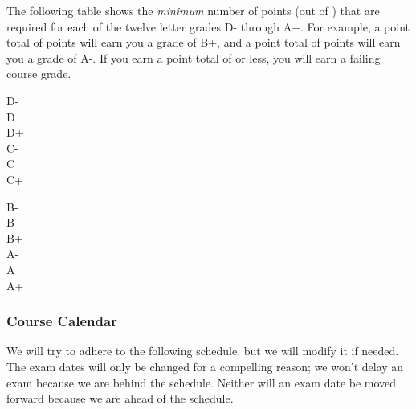 \documentclass[12pt,fullpage]{article}
\newcounter{ex}\setcounter{ex}{0}
\newenvironment{mypar}[2]
  {\begin{list}{}%
    {\setlength\leftmargin{#1}
    \setlength\rightmargin{#2}}
    \item[]}
  {\end{list}}
\begin{document}
 
\noindent The following table shows the \emph{minimum} number of points (out of \points) that
 are required for each of the twelve letter grades D- through A+. For
 example, a point total of \Bp\/  points will earn you a grade of B+,  and 
 a point total of \Am\/ points will earn you a grade of A-. If you earn a point
 total of \F\/  or less, you will earn a failing course grade.
  
  \vspace{0.1in}
      \begin{minipage}{5.5in}
   \centering 
 \begin{mypar}{0.25in}{0.25in}
     \begin{minipage}{2.5in}
         D-  \dotfill \Dm \\
         D \dotfill \D \\
         D+ \dotfill \Dp \\
         C- \dotfill \Cm  \\
         C \dotfill \C \\
         C+ \dotfill \Cp 
         \end{minipage}
     \phantom{xxx}
     \begin{minipage}{2.5in}
         B- \dotfill \Bm \\
         B \dotfill  \B \\
         B+ \dotfill  \Bp\\
         A- \dotfill  \Am \\
         A \dotfill  \A \\
         A+ \dotfill  \Ap
     \end{minipage}
 \end{mypar} 
 \end{minipage}

 \subsubsection*{Course Calendar}

 We will try to adhere to the following schedule, but we will modify it
 if needed. The exam dates will only be changed for a compelling
 reason; we won't delay an exam because we are behind the
 schedule. Neither will an exam date be moved forward because we are
 ahead of the schedule.
 
\end{document}
